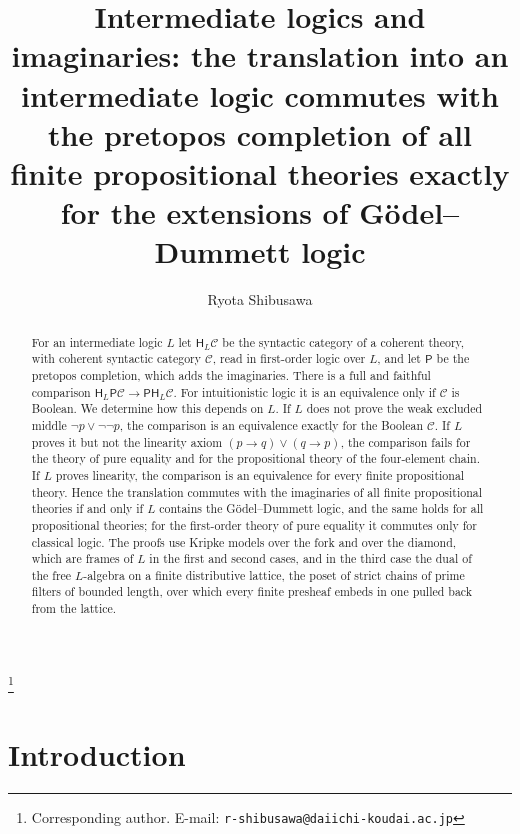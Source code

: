\documentclass[11pt]{amsart}
\theoremstyle{definition}
\newcommand{\PP}{\mathsf P}
\newcommand{\HH}{\mathsf H}
\newcommand{\cC}{\mathcal C}
\begin{document}
\title[Intermediate logics and imaginaries]{Intermediate logics and imaginaries: the translation into an intermediate logic commutes with the pretopos completion of all finite propositional theories exactly for the extensions of G\"odel--Dummett logic}
\author{Ryota Shibusawa}
\thanks{Corresponding author. E-mail: \texttt{r-shibusawa@daiichi-koudai.ac.jp}}
\address{Daiichi Institute of Technology}

\begin{abstract}
For an intermediate logic $L$ let $\HH_L\cC$ be the syntactic category
of a coherent theory, with coherent syntactic category $\cC$, read in
first-order logic over $L$, and let $\PP$ be the pretopos completion,
which adds the imaginaries. There is a full and faithful comparison
$\HH_L\PP\cC\to\PP\HH_L\cC$. For intuitionistic logic it is an
equivalence only if $\cC$ is Boolean. We determine how this depends on
$L$. If $L$ does not prove the weak excluded middle $\neg p\vee\neg\neg
p$, the comparison is an equivalence exactly for the Boolean $\cC$. If
$L$ proves it but not the linearity axiom $(p\to q)\vee(q\to p)$, the
comparison fails for the theory of pure equality and for the
propositional theory of the four-element chain. If $L$ proves
linearity, the comparison is an equivalence for every finite
propositional theory. Hence the translation commutes with the
imaginaries of all finite propositional theories if and only if $L$
contains the G\"odel--Dummett logic, and the same holds for all
propositional theories; for the first-order theory of
pure equality it commutes only for classical logic. The proofs use Kripke models over
the fork and over the diamond, which are frames of $L$ in the first and
second cases, and in the third case the dual of the free $L$-algebra on
a finite distributive lattice, the poset of strict chains of prime
filters of bounded length, over which every finite presheaf embeds in one pulled back
from the lattice.
\end{abstract}

\maketitle

\section{Introduction}
\end{document}

